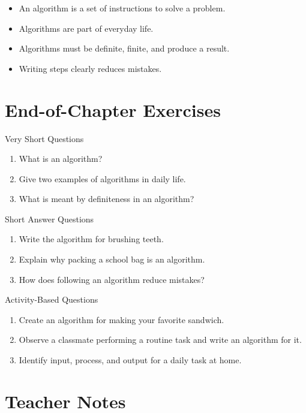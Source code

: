 \begin{itemize}
    \item An algorithm is a set of instructions to solve a problem.
    \item Algorithms are part of everyday life.
    \item Algorithms must be definite, finite, and produce a result.
    \item Writing steps clearly reduces mistakes.
\end{itemize}

\section{End-of-Chapter Exercises}

\begin{exercise}{Very Short Questions}
\begin{enumerate}
    \item What is an algorithm?
    \item Give two examples of algorithms in daily life.
    \item What is meant by definiteness in an algorithm?
\end{enumerate}
\end{exercise}

\begin{exercise}{Short Answer Questions}
\begin{enumerate}
    \item Write the algorithm for brushing teeth.
    \item Explain why packing a school bag is an algorithm.
    \item How does following an algorithm reduce mistakes?
\end{enumerate}
\end{exercise}

\begin{exercise}{Activity-Based Questions}
\begin{enumerate}
    \item Create an algorithm for making your favorite sandwich.
    \item Observe a classmate performing a routine task and write an algorithm for it.
    \item Identify input, process, and output for a daily task at home.
\end{enumerate}
\end{exercise}

\section{Teacher Notes}

